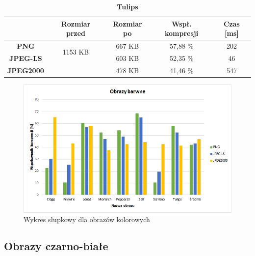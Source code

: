 \begin{table}[!h]
	\centering
	\caption{\textbf{Tulips}}
	\label{my-label}
	\begin{tabular}{|c|c|c|c|c|}                                             
		\hline
		& \textbf{Rozmiar przed} & \textbf{Rozmiar po} & \textbf{Wspł. kompresji} & \textbf{Czas {[}ms{]}} \\ \hline 
		\textbf{PNG}      &          \multicolumn{1}{c|}{\multirow{2}{*}{1153 KB}}             &        667 KB             &      57,88 \%                   &          202                   \\\cline{3-5}
		\textbf{JPEG-LS}  &                        &      603  KB             &       52,35 \%                  &          46                \\\cline{3-5}
		\textbf{JPEG2000} &                        &      478 KB               &       41,46 \%                  &     547                 \\ \hline
	\end{tabular}
\end{table}


\begin{figure}[!h]
	\centering
	\includegraphics[width=1.1\textwidth]{./color.png}
	\caption{Wykres słupkowy dla obrazów kolorowych}
	\label{img:color}
\end{figure}

\clearpage








\subsection{Obrazy czarno-białe}

